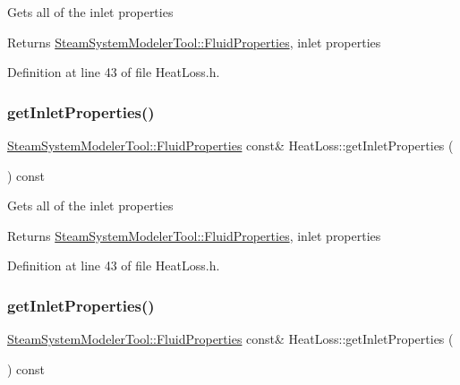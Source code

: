 Gets all of the inlet properties \begin{DoxyReturn}{Returns}
\hyperlink{struct_steam_system_modeler_tool_1_1_fluid_properties}{Steam\+System\+Modeler\+Tool\+::\+Fluid\+Properties}, inlet properties 
\end{DoxyReturn}


Definition at line 43 of file Heat\+Loss.\+h.

\mbox{\label{class_heat_loss_a7bea461460dbacf1855d5375bbf6c097}} 
\subsubsection{\texorpdfstring{get\+Inlet\+Properties()}{getInletProperties()}\hspace{0.1cm}{\footnotesize\ttfamily [2/3]}}
{\footnotesize\ttfamily \hyperlink{struct_steam_system_modeler_tool_1_1_fluid_properties}{Steam\+System\+Modeler\+Tool\+::\+Fluid\+Properties} const\& Heat\+Loss\+::get\+Inlet\+Properties (\begin{DoxyParamCaption}{ }\end{DoxyParamCaption}) const\hspace{0.3cm}{\ttfamily [inline]}}

Gets all of the inlet properties \begin{DoxyReturn}{Returns}
\hyperlink{struct_steam_system_modeler_tool_1_1_fluid_properties}{Steam\+System\+Modeler\+Tool\+::\+Fluid\+Properties}, inlet properties 
\end{DoxyReturn}


Definition at line 43 of file Heat\+Loss.\+h.

\mbox{\label{class_heat_loss_a7bea461460dbacf1855d5375bbf6c097}} 
\subsubsection{\texorpdfstring{get\+Inlet\+Properties()}{getInletProperties()}\hspace{0.1cm}{\footnotesize\ttfamily [3/3]}}
{\footnotesize\ttfamily \hyperlink{struct_steam_system_modeler_tool_1_1_fluid_properties}{Steam\+System\+Modeler\+Tool\+::\+Fluid\+Properties} const\& Heat\+Loss\+::get\+Inlet\+Properties (\begin{DoxyParamCaption}{ }\end{DoxyParamCaption}) const\hspace{0.3cm}{\ttfamily [inline]}}

